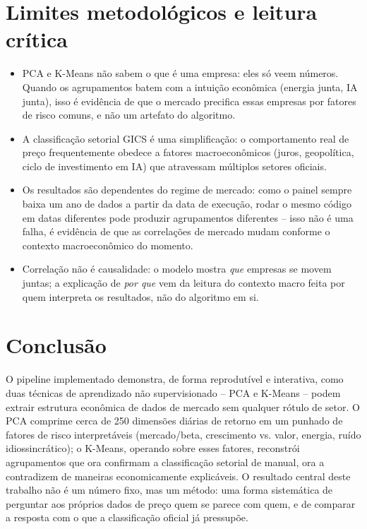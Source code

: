 \documentclass[12pt,oneside,a4paper,brazil,sumario=tradicional]{abntex2}
\begin{document}
\section{Limites metodológicos e leitura crítica}

\begin{itemize}
  \item PCA e K-Means não sabem o que é uma empresa: eles só veem números.
        Quando os agrupamentos batem com a intuição econômica (energia junta, IA
        junta), isso é evidência de que o mercado precifica essas empresas por
        fatores de risco comuns, e não um artefato do algoritmo.
  \item A classificação setorial GICS é uma simplificação: o comportamento real
        de preço frequentemente obedece a fatores macroeconômicos (juros,
        geopolítica, ciclo de investimento em IA) que atravessam múltiplos
        setores oficiais.
  \item Os resultados são dependentes do regime de mercado: como o painel
        sempre baixa um ano de dados a partir da data de execução, rodar o
        mesmo código em datas diferentes pode produzir agrupamentos diferentes
        -- isso não é uma falha, é evidência de que as correlações de mercado
        mudam conforme o contexto macroeconômico do momento.
  \item Correlação não é causalidade: o modelo mostra \emph{que} empresas se
        movem juntas; a explicação de \emph{por que} vem da leitura do
        contexto macro feita por quem interpreta os resultados, não do
        algoritmo em si.
\end{itemize}

\section{Conclusão}

O pipeline implementado demonstra, de forma reprodutível e interativa, como duas
técnicas de aprendizado não supervisionado -- PCA e K-Means -- podem extrair
estrutura econômica de dados de mercado sem qualquer rótulo de setor. O PCA
comprime cerca de 250 dimensões diárias de retorno em um punhado de fatores de
risco interpretáveis (mercado/beta, crescimento vs. valor, energia, ruído
idiossincrático); o K-Means, operando sobre esses fatores, reconstrói
agrupamentos que ora confirmam a classificação setorial de manual, ora a
contradizem de maneiras economicamente explicáveis. O resultado central deste
trabalho não é um número fixo, mas um método: uma forma sistemática de perguntar
aos próprios dados de preço quem se parece com quem, e de comparar a resposta com
o que a classificação oficial já pressupõe.
\end{document}
